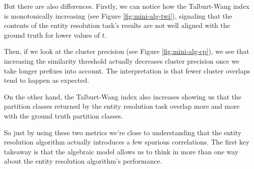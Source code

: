 \documentclass[11pt]{article}
\begin{document}
    But there are also differences.
    Firstly, we can notice how the Talburt-Wang index is monotonically
    increasing (see Figure \ref{fig:mini-alg-twi}), signaling that the contents of the entity resolution task's
    results are not well aligned with the ground truth for lower values of $t$.
    
    Then, if we look at the cluster precision (see Figure \ref{fig:mini-alg-cp}), we see that increasing the
    similarity threshold actually decreases cluster precision once we take longer prefixes into account.
    The interpretation is that fewer cluster overlaps tend to happen as expected. 

    On the other hand, the Talburt-Wang index also increases showing us that the
    partition classes returned by the entity resolution task overlap more and
    more with the ground truth partition classes.
    
    So just by using these two metrics we're close to understanding that the
    entity resolution algorithm actually introduces a few spurious correlations.
    The first key takeaway is that the algebraic model allows us to think in
    more than one way about the entity resolution algorithm's performance.
\end{document}
